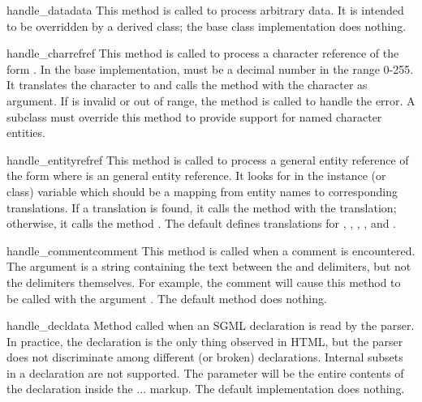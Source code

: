 \begin{methoddesc}{handle_data}{data}
This method is called to process arbitrary data.  It is intended to be
overridden by a derived class; the base class implementation does
nothing.
\end{methoddesc}

\begin{methoddesc}{handle_charref}{ref}
This method is called to process a character reference of the form
.  In the base implementation,  must
be a decimal number in the
range 0-255.  It translates the character to \ASCII{} and calls the
method  with the character as argument.  If
 is invalid or out of range, the method
 is called to handle the error.  A
subclass must override this method to provide support for named
character entities.
\end{methoddesc}

\begin{methoddesc}{handle_entityref}{ref}
This method is called to process a general entity reference of the
form  where  is an general entity
reference.  It looks for  in the instance (or class)
variable  which should be a mapping from entity
names to corresponding translations.  If a translation is found, it
calls the method  with the translation;
otherwise, it calls the method .
The default  defines translations for
, , , , and
.
\end{methoddesc}

\begin{methoddesc}{handle_comment}{comment}
This method is called when a comment is encountered.  The
 argument is a string containing the text between the
\samp{<!--} and \samp{-->} delimiters, but not the delimiters
themselves.  For example, the comment  will
cause this method to be called with the argument .  The
default method does nothing.
\end{methoddesc}

\begin{methoddesc}{handle_decl}{data}
Method called when an SGML declaration is read by the parser.  In
practice, the  declaration is the only thing observed in
HTML, but the parser does not discriminate among different (or broken)
declarations.  Internal subsets in a  declaration are
not supported.  The  parameter will be the entire contents
of the declaration inside the \code{<!}...\code{>} markup.  The
default implementation does nothing.
\end{methoddesc}

